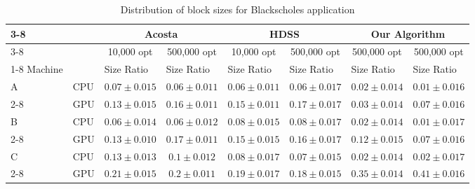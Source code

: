 \documentclass[journal]{IEEEtran}
\begin{document}
\begin{table}[htb]
\centering
\caption{Distribution of block sizes for Blackscholes application}
\begin{scriptsize}
\begin{tabular}{|l|l|l|l|l|l|l|l|}
\cline{3-8}
\multicolumn{1}{l}{} &  & \multicolumn{2}{c|}{Acosta} & \multicolumn{2}{c|}{HDSS} & \multicolumn{2}{c|}{Our Algorithm} \\ 
\cline{3-8}
\multicolumn{1}{l}{} &  & \multicolumn{1}{c|}{10,000 opt} & \multicolumn{1}{c|}{500,000 opt} & \multicolumn{1}{c|}{10,000 opt} & \multicolumn{1}{c|}{500,000 opt} & \multicolumn{1}{c|}{500,000 opt} & \multicolumn{1}{c|}{500,000 opt} \\ 
\cline{1-8}
\multicolumn{1}{|c}{} Machine &  & Size Ratio & Size Ratio & Size Ratio & Size Ratio & Size Ratio & Size Ratio \\ 
\hline
A & CPU & \multicolumn{1}{c|}{$0.07 \pm 0.015$} & \multicolumn{1}{c|}{$0.06 \pm 0.011$} & \multicolumn{1}{c|}{$0.06 \pm 0.011$} & \multicolumn{1}{c|}{$0.06 \pm 0.017$} & \multicolumn{1}{c|}{$0.02 \pm 0.014$} & \multicolumn{1}{c|}{$0.01 \pm 0.016$} \\ 
\cline{2-8}
 & GPU & \multicolumn{1}{c|}{$0.13 \pm 0.015$} & \multicolumn{1}{c|}{$0.16 \pm 0.011$} & \multicolumn{1}{c|}{$0.15  \pm 0.011$} & \multicolumn{1}{c|}{$0.17  \pm 0.017$} & \multicolumn{1}{c|}{$0.03  \pm 0.014$} & \multicolumn{1}{c|}{$0.07  \pm 0.016$} \\ 
\hline
B & CPU & \multicolumn{1}{c|}{$0.06 \pm 0.014$} & \multicolumn{1}{c|}{$0.06  \pm 0.012$} & \multicolumn{1}{c|}{$0.08 \pm 0.015$} & \multicolumn{1}{c|}{$0.08 \pm 0.017$} & \multicolumn{1}{c|}{$0.02 \pm 0.014$} & \multicolumn{1}{c|}{$0.01 \pm 0.017$} \\ 
\cline{2-8}
 & GPU & \multicolumn{1}{c|}{$0.13 \pm 0.010$} & \multicolumn{1}{c|}{$0.17 \pm 0.011$} & \multicolumn{1}{c|}{$0.15 \pm 0.015$} & \multicolumn{1}{c|}{$0.16 \pm 0.017$} & \multicolumn{1}{c|}{$0.12 \pm 0.015$} & \multicolumn{1}{c|}{$0.07 \pm 0.016$} \\ 
\hline
C & CPU & \multicolumn{1}{c|}{$0.13 \pm 0.013$} & \multicolumn{1}{c|}{$0.1 \pm 0.012$} & \multicolumn{1}{c|}{$0.08 \pm 0.017$} & \multicolumn{1}{c|}{$0.07 \pm 0.015$} & \multicolumn{1}{c|}{$0.02 \pm 0.014$} & \multicolumn{1}{c|}{$0.02 \pm 0.017$} \\ 
\cline{2-8}
 & GPU & \multicolumn{1}{c|}{$0.21  \pm 0.015$} & \multicolumn{1}{c|}{$0.2  \pm 0.011$} & \multicolumn{1}{c|}{$0.19 \pm 0.017$} & \multicolumn{1}{c|}{$0.18  \pm 0.015$} & \multicolumn{1}{c|}{$0.35 \pm 0.014$} & \multicolumn{1}{c|}{$0.41 \pm 0.016$} \\ 

\end{tabular}
\end{scriptsize}
\end{table}
\end{document}

